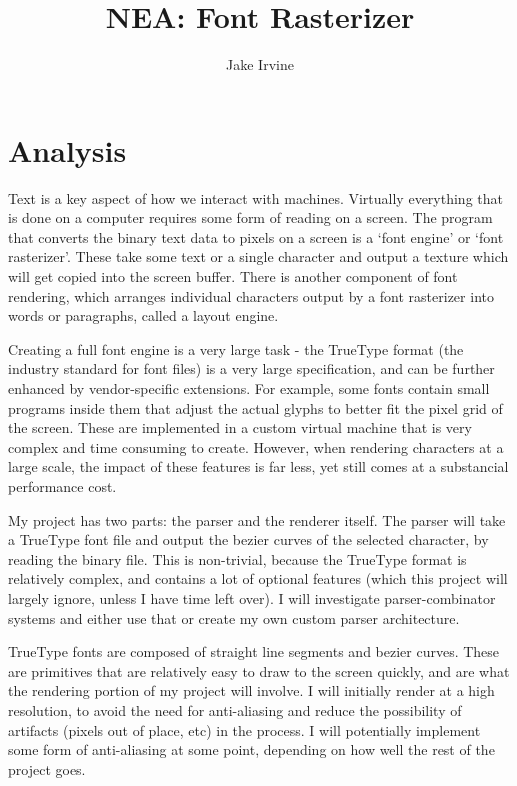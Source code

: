 \documentclass{report}
\begin{document}
\title{NEA: Font Rasterizer}
\author{Jake Irvine}

\maketitle
\chapter{Analysis}

Text is a key aspect of how we interact with machines. Virtually everything that
is done on a computer requires some form of reading on a screen. The program
that converts the binary text data to pixels on a screen is a `font engine' or
`font rasterizer'. These take some text or a single character and output a
texture which will get copied into the screen buffer. There is another component
of font rendering, which arranges individual characters output by a font
rasterizer into words or paragraphs, called a layout engine.

Creating a full font engine is a very large task - the TrueType format (the
industry standard for font files) is a very large specification, and can be
further enhanced by vendor-specific extensions. For example, some fonts contain
small programs inside them that adjust the actual glyphs to better fit the pixel
grid of the screen. These are implemented in a custom virtual machine that is
very complex and time consuming to create. However, when rendering characters at
a large scale, the impact of these features is far less, yet still comes at a
substancial performance cost.

My project has two parts: the parser and the renderer itself. The parser will
take a TrueType font file and output the bezier curves of the selected
character, by reading the binary file. This is non-trivial, because the TrueType
format is relatively complex, and contains a lot of optional features (which
this project will largely ignore, unless I have time left over). I will
investigate parser-combinator systems and either use that or create my own
custom parser architecture.

TrueType fonts are composed of straight line segments and bezier curves. These
are primitives that are relatively easy to draw to the screen quickly, and are
what the rendering portion of my project will involve. I will initially render
at a high resolution, to avoid the need for anti-aliasing and reduce the
possibility of artifacts (pixels out of place, etc) in the process. I will
potentially implement some form of anti-aliasing at some point, depending on how
well the rest of the project goes.
\end{document}
